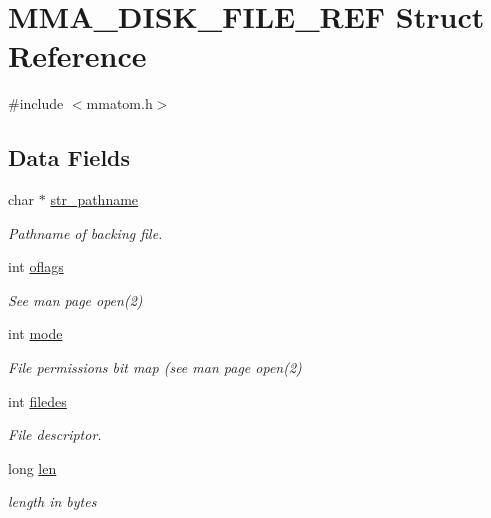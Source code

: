 \hypertarget{struct_m_m_a___d_i_s_k___f_i_l_e___r_e_f}{\section{M\-M\-A\-\_\-\-D\-I\-S\-K\-\_\-\-F\-I\-L\-E\-\_\-\-R\-E\-F Struct Reference}
\label{struct_m_m_a___d_i_s_k___f_i_l_e___r_e_f}
}


{\ttfamily \#include $<$mmatom.\-h$>$}

\subsection*{Data Fields}
\begin{DoxyCompactItemize}
\item 
char $\ast$ \hyperlink{struct_m_m_a___d_i_s_k___f_i_l_e___r_e_f_a1b3bbe6b0268b428c4fbd43e04c30e1a}{str\-\_\-pathname}
\begin{DoxyCompactList}\small\item\em Pathname of backing file. \end{DoxyCompactList}\item 
int \hyperlink{struct_m_m_a___d_i_s_k___f_i_l_e___r_e_f_ad059e7b9fff7394a6042adf9bcc062ed}{oflags}
\begin{DoxyCompactList}\small\item\em See man page open(2) \end{DoxyCompactList}\item 
int \hyperlink{struct_m_m_a___d_i_s_k___f_i_l_e___r_e_f_a1ea5d0cb93f22f7d0fdf804bd68c3326}{mode}
\begin{DoxyCompactList}\small\item\em File permissions bit map (see man page open(2) \end{DoxyCompactList}\item 
int \hyperlink{struct_m_m_a___d_i_s_k___f_i_l_e___r_e_f_ac657804269d18c2152f07bc54c20874d}{filedes}
\begin{DoxyCompactList}\small\item\em File descriptor. \end{DoxyCompactList}\item 
long \hyperlink{struct_m_m_a___d_i_s_k___f_i_l_e___r_e_f_aaccba9d5adc3f6c39aad767db95ba484}{len}
\begin{DoxyCompactList}\small\item\em length in bytes \end{DoxyCompactList}\end{DoxyCompactItemize}


